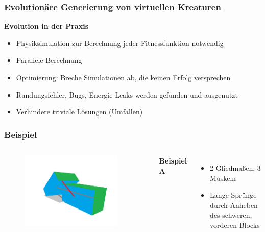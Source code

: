 \documentclass{beamer}
\begin{document}
\begin{frame}
	\frametitle{Evolutionäre Generierung von virtuellen Kreaturen}
	
	\textbf{Evolution in der Praxis}
	\begin{itemize}
		\item Physiksimulation zur Berechnung jeder Fitnessfunktion notwendig \pause
		\item Parallele Berechnung \pause
		\item Optimierung: Breche Simulationen ab, die keinen Erfolg versprechen \pause
		\item Rundungsfehler, Bugs, Energie-Leaks werden gefunden und ausgenutzt \pause
		\item Verhindere triviale Lösungen (Umfallen)
	\end{itemize}
\end{frame}


\begin{frame}
	\frametitle{Beispiel}
	\begin{columns}
		\begin{figure}
			\includegraphics[width=0.9\textwidth]{img/type1.png}
		\end{figure}
		\textbf{Beispiel A}\\
		\begin{itemize}
			\item 2 Gliedmaßen, 3 Muskeln
			\item Lange Sprünge durch Anheben des schweren, vorderen Blocks
		\end{itemize}		
	\end{columns}	
\end{frame}
\end{document}
